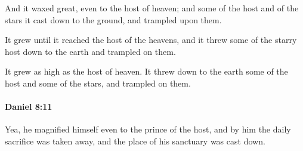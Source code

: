 			\begin{versebox}
					\item[BHS] 
					\item[LXX] 
					\item[ASV] And it waxed great, even to the host of heaven; and some of the host and of the stars it cast down to the ground, and trampled upon them.
					\item[NIV] It grew until it reached the host of the heavens, and it threw some of the starry host down to the earth and trampled on them.
					\item[NRSV] It grew as high as the host of heaven. It threw down to the earth some of the host and some of the stars, and trampled on them.
			\end{versebox}

		\paragraph{Daniel 8:11} %
			\label{DANIEL-8-11}

			Yea, he magnified himself even to the prince of the host, and by him the daily sacrifice was taken away, and the place of his sanctuary was cast down.

